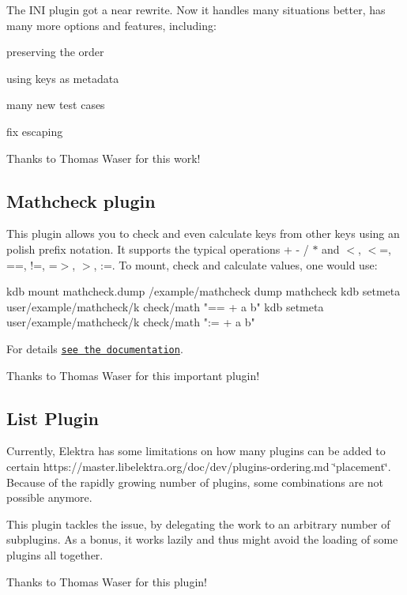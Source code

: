 The I\+NI plugin got a near rewrite. Now it handles many situations better, has many more options and features, including\+:


\begin{DoxyItemize}
\item preserving the order
\item using keys as metadata
\item many new test cases
\item fix escaping
\end{DoxyItemize}

Thanks to Thomas Waser for this work!

\subsection*{Mathcheck plugin}

This plugin allows you to check and even calculate keys from other keys using an polish prefix notation. It supports the typical operations {\ttfamily + -\/ / $\ast$} and {\ttfamily $<$, $<$=, ==, !=, =$>$, $>$, \+:=}. To mount, check and calculate values, one would use\+:


\begin{DoxyCode}
kdb mount mathcheck.dump /example/mathcheck dump mathcheck
kdb setmeta user/example/mathcheck/k check/math "== + a b"
kdb setmeta user/example/mathcheck/k check/math ":= + a b"
\end{DoxyCode}


For details \href{https://master.libelektra.org/src/plugins/mathcheck/}{\tt see the documentation}.

Thanks to Thomas Waser for this important plugin!

\subsection*{List Plugin}

Currently, Elektra has some limitations on how many plugins can be added to certain https\+://master.libelektra.\+org/doc/dev/plugins-\/ordering.md \char`\"{}placement\char`\"{}. Because of the rapidly growing number of plugins, some combinations are not possible anymore.

This plugin tackles the issue, by delegating the work to an arbitrary number of subplugins. As a bonus, it works lazily and thus might avoid the loading of some plugins all together.

Thanks to Thomas Waser for this plugin!

